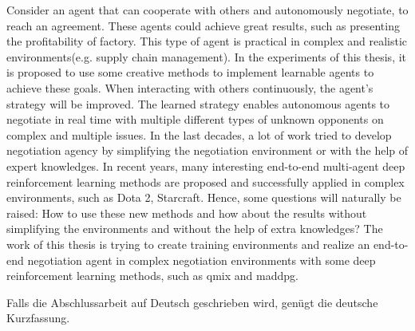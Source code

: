 
Consider an agent that can cooperate with others and autonomously negotiate, to reach an agreement. These agents could achieve great results, such as presenting the profitability of factory. This type of agent is practical in complex and realistic environments(e.g. supply chain management). In the experiments of this thesis, it is proposed to use some creative methods to implement learnable agents to achieve these goals. When interacting with others continuously, the agent’s strategy will be improved. The learned strategy enables autonomous agents to negotiate in real time with multiple different types of unknown opponents on complex and multiple issues. In the last decades, a lot of work tried to develop negotiation agency by simplifying the negotiation environment or with the help of expert knowledges. In recent years, many interesting end-to-end multi-agent deep reinforcement learning methods are proposed and successfully applied in complex environments, such as Dota 2, Starcraft. Hence, some questions will naturally be raised: How to use these new methods and how about the results without simplifying the environments and without the help of extra knowledges? The work of this thesis is trying to create training environments and realize an end-to-end negotiation agent in complex negotiation environments with some deep reinforcement learning methods, such as \gls{qmix} and \gls{maddpg}.


Falls die Abschlussarbeit auf Deutsch geschrieben wird, genügt die deutsche Kurzfassung.
